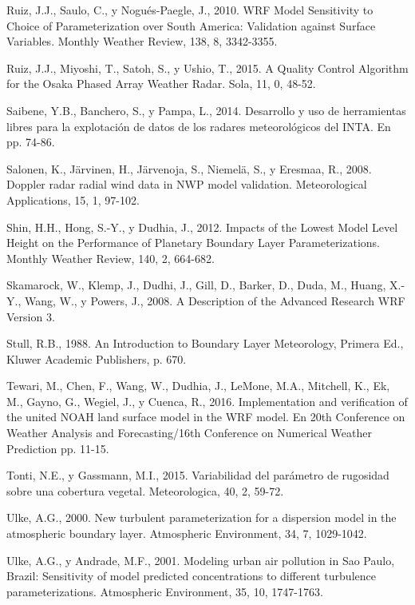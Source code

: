 \documentclass[12pt,spanish,oneside, a4paper]{book}
\begin{document}
\hypertarget{ref-Ruiz2010}{}
Ruiz, J.J., Saulo, C., y Nogués-Paegle, J., 2010. WRF Model Sensitivity
to Choice of Parameterization over South America: Validation against
Surface Variables. Monthly Weather Review, 138, 8, 3342-3355.

\hypertarget{ref-Ruiz2015}{}
Ruiz, J.J., Miyoshi, T., Satoh, S., y Ushio, T., 2015. A Quality Control
Algorithm for the Osaka Phased Array Weather Radar. Sola, 11, 0, 48-52.

\hypertarget{ref-Saibene2014}{}
Saibene, Y.B., Banchero, S., y Pampa, L., 2014. Desarrollo y uso de
herramientas libres para la explotación de datos de los radares
meteorológicos del INTA. En pp. 74-86.

\hypertarget{ref-Salonen2008}{}
Salonen, K., Järvinen, H., Järvenoja, S., Niemelä, S., y Eresmaa, R.,
2008. Doppler radar radial wind data in NWP model validation.
Meteorological Applications, 15, 1, 97-102.

\hypertarget{ref-Shin2012}{}
Shin, H.H., Hong, S.-Y., y Dudhia, J., 2012. Impacts of the Lowest Model
Level Height on the Performance of Planetary Boundary Layer
Parameterizations. Monthly Weather Review, 140, 2, 664-682.

\hypertarget{ref-Skamarock2008}{}
Skamarock, W., Klemp, J., Dudhi, J., Gill, D., Barker, D., Duda, M.,
Huang, X.-Y., Wang, W., y Powers, J., 2008. A Description of the
Advanced Research WRF Version 3.

\hypertarget{ref-Stull1988}{}
Stull, R.B., 1988. An Introduction to Boundary Layer Meteorology,
Primera Ed., Kluwer Academic Publishers, p. 670.

\hypertarget{ref-Tewari2004}{}
Tewari, M., Chen, F., Wang, W., Dudhia, J., LeMone, M.A., Mitchell, K.,
Ek, M., Gayno, G., Wegiel, J., y Cuenca, R., 2016. Implementation and
verification of the united NOAH land surface model in the WRF model. En
20th Conference on Weather Analysis and Forecasting/16th Conference on
Numerical Weather Prediction pp. 11-15.

\hypertarget{ref-Tonti2015}{}
Tonti, N.E., y Gassmann, M.I., 2015. Variabilidad del parámetro de
rugosidad sobre una cobertura vegetal. Meteorologica, 40, 2, 59-72.

\hypertarget{ref-Ulke2000}{}
Ulke, A.G., 2000. New turbulent parameterization for a dispersion model
in the atmospheric boundary layer. Atmospheric Environment, 34, 7,
1029-1042.

\hypertarget{ref-Ulke2001}{}
Ulke, A.G., y Andrade, M.F., 2001. Modeling urban air pollution in Sao
Paulo, Brazil: Sensitivity of model predicted concentrations to
different turbulence parameterizations. Atmospheric Environment, 35, 10,
1747-1763.
\end{document}
